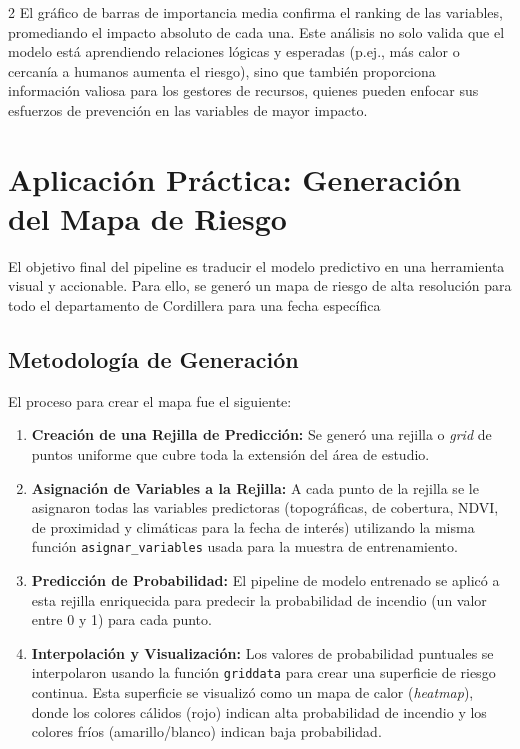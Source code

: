 \documentclass[a4paper,10pt]{article}
\begin{document}
\begin{multicols}{2}
El gráfico de barras de importancia media confirma el ranking de las variables, promediando el impacto absoluto de cada una.
Este análisis no solo valida que el modelo está aprendiendo relaciones lógicas y esperadas (p.ej., más calor o cercanía a humanos aumenta el riesgo), sino que también proporciona información valiosa para los gestores de recursos, quienes pueden enfocar sus esfuerzos de prevención en las variables de mayor impacto.

\section{Aplicación Práctica: Generación del Mapa de Riesgo}
El objetivo final del pipeline es traducir el modelo predictivo en una herramienta visual y accionable. Para ello, se generó un mapa de riesgo de alta resolución para todo el departamento de Cordillera para una fecha específica

\subsection{Metodología de Generación}
El proceso para crear el mapa fue el siguiente:
\begin{enumerate}
    \item \textbf{Creación de una Rejilla de Predicción:} Se generó una rejilla o \textit{grid} de puntos uniforme que cubre toda la extensión del área de estudio.
    \item \textbf{Asignación de Variables a la Rejilla:} A cada punto de la rejilla se le asignaron todas las variables predictoras (topográficas, de cobertura, NDVI, de proximidad y climáticas para la fecha de interés) utilizando la misma función \texttt{asignar\_variables} usada para la muestra de entrenamiento.
    \item \textbf{Predicción de Probabilidad:} El pipeline de modelo entrenado se aplicó a esta rejilla enriquecida para predecir la probabilidad de incendio (un valor entre 0 y 1) para cada punto.
    \item \textbf{Interpolación y Visualización:} Los valores de probabilidad puntuales se interpolaron usando la función \texttt{griddata} para crear una superficie de riesgo continua. Esta superficie se visualizó como un mapa de calor (\textit{heatmap}), donde los colores cálidos (rojo) indican alta probabilidad de incendio y los colores fríos (amarillo/blanco) indican baja probabilidad.
\end{enumerate}


\end{multicols}
\end{document}
